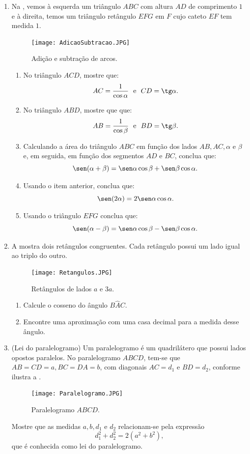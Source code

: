 \begin{enumerate}
\item{}
Na , vemos à esquerda um triângulo $ABC$ com altura $AD$ de comprimento $1$ e à direita, temos um triângulo retângulo $EFG$ em $F$ cujo cateto $EF$ tem medida $1$.
\begin{figure}[H]
    \centering
    \texttt{[image: AdicaoSubtracao.JPG]}
    \caption{Adição e subtração de arcos.}
    \label{AdicaoSubtracao}
\end{figure}
\begin{enumerate}
     \item No triângulo $ACD$, mostre que: 
     $$AC=\frac{1}{\cos\alpha} \ \ \text{e} \ \  CD=\tg\alpha.$$
     \item No triângulo $ABD$, mostre que que: 
     $$AB=\frac{1}{\cos\beta} \ \ \text{e} \ \  BD=\tg\beta.$$
    \item Calculando a área do triângulo $ABC$ em função dos lados $AB, AC, \alpha$ e $\beta$ e, em seguida, em função dos segmentos $AD$ e $BC$, conclua que:
    $$\sen(\alpha+\beta)=\sen\alpha\cos\beta+\sen\beta\cos\alpha.$$
    \item Usando o item anterior, conclua que: 
    $$\sen(2\alpha)=2\sen\alpha\cos\alpha.$$
    \item Usando o triângulo $EFG$ conclua que: 
    $$\sen(\alpha-\beta)=\sen\alpha\cos\beta-\sen\beta\cos\alpha.$$
\end{enumerate}

\item{}
A  mostra dois retângulos congruentes. Cada retângulo possui um lado igual ao triplo do outro.
\begin{figure}[H]
    \centering
    \texttt{[image: Retangulos.JPG]}
    \caption{Retângulos de lados $a$ e $3a$.}
    \label{Retangulos}
\end{figure}
\begin{enumerate}
    \item Calcule o cosseno do ângulo $B\hat{A}C$.
    \item Encontre uma aproximação com uma casa decimal para a medida desse ângulo.
\end{enumerate}

\item{}
(Lei do paralelogramo) Um paralelogramo é um quadrilátero que possui lados opostos paralelos. No paralelogramo $ABCD$, tem-se que $AB=CD=a,BC=DA=b$, com  diagonais $AC=d_1$ e $BD=d_2$, conforme ilustra a . 
\begin{figure}[H]
    \centering
    \texttt{[image: Paralelogramo.JPG]}
    \caption{Paralelogramo $ABCD$.}
    \label{Parelelogramo}
\end{figure}
Mostre que as medidas $a,b, d_1$ e $d_2$ relacionam-se pela expressão
$$d_1^2+d_2^2=2(a^2+b^2),$$
que é conhecida como lei do paralelogramo.


\end{enumerate}
